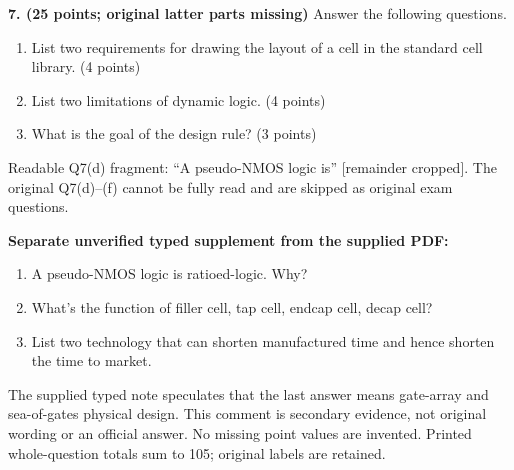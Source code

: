 \documentclass[10pt]{article}
\begin{document}
\textbf{7. (25 points; original latter parts missing)} Answer the following questions.
\begin{enumerate}[label=(\alph*),leftmargin=7mm]
\item List two requirements for drawing the layout of a cell in the standard cell library. (4 points)
\item List two limitations of dynamic logic. (4 points)
\item What is the goal of the design rule? (3 points)
\end{enumerate}
Readable Q7(d) fragment: ``A pseudo-NMOS logic is'' [remainder cropped]. The original Q7(d)--(f) cannot be fully read and are skipped as original exam questions.

\textbf{Separate unverified typed supplement from the supplied PDF:}
\begin{enumerate}[label=(\alph*),start=4,leftmargin=7mm]
\item A pseudo-NMOS logic is ratioed-logic. Why?
\item What's the function of filler cell, tap cell, endcap cell, decap cell?
\item List two technology that can shorten manufactured time and hence shorten the time to market.
\end{enumerate}
The supplied typed note speculates that the last answer means gate-array and sea-of-gates physical design. This comment is secondary evidence, not original wording or an official answer. No missing point values are invented. Printed whole-question totals sum to 105; original labels are retained.
\end{document}
